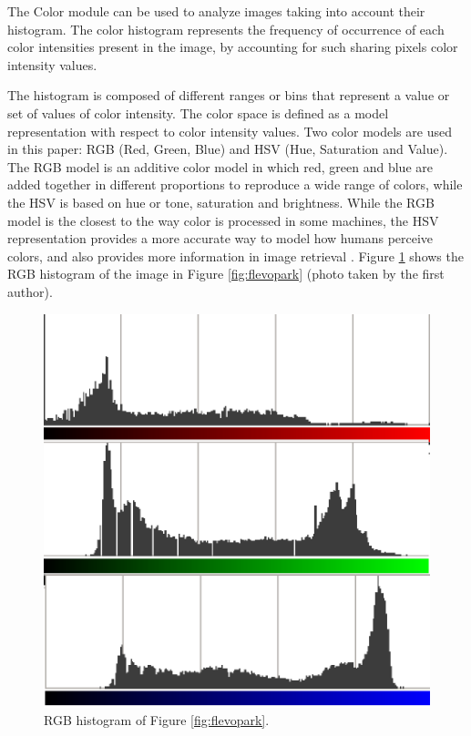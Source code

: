 \documentclass[a4paper,twoside]{article}
\begin{document}
The Color module can be used to analyze images taking into account their histogram. The color histogram represents the frequency of occurrence of each color intensities present in the image, by accounting for such sharing pixels color intensity values.

The histogram is composed of different ranges or bins that represent a value or set of values of color intensity. The color space is defined as a model representation with respect to color intensity values. Two color models are used in this paper: RGB (Red, Green, Blue) and HSV (Hue, Saturation and Value). The RGB model is an additive color model in which red, green and blue are added together in different proportions to reproduce a wide range of colors, while the HSV is based on hue or tone, saturation and brightness. While the RGB model is the closest to the way color is processed in some machines, the HSV representation provides a more accurate way to model how humans perceive colors, and also provides more information in image retrieval \cite{COLORDIFFERENCES}.
Figure \ref{fig:histogram} shows the RGB histogram of the image in Figure \ref{fig:flevopark} (photo taken by the first author).

\begin{figure}
\centering
   \includegraphics[scale =0.6] {images/histogram.eps}
\caption{RGB histogram of Figure \ref{fig:flevopark}. }
\label{fig:histogram}
\end{figure}
\end{document}
